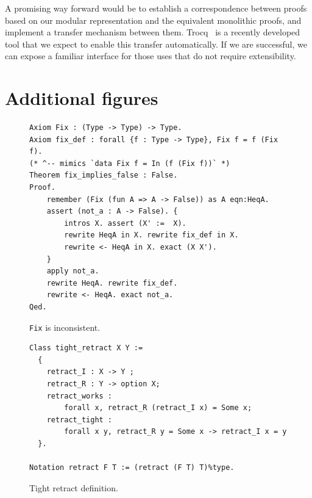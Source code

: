 \documentclass[sigplan,nonacm,review]{acmart}
\begin{document}
A promising way forward would be to establish a correspondence between proofs based on our modular representation and the equivalent monolithic proofs, and implement a transfer mechanism between them. Trocq~\cite{cohen2024trocq} is a recently developed tool that we expect to enable this transfer automatically. If we are successful, we can expose a familiar interface for those uses that do not require extensibility.





\appendix

\section{Additional figures}
\label{sec:additional-figures}

\begin{figure}[H]
\begin{lstlisting}[language=Coq]
Axiom Fix : (Type -> Type) -> Type.
Axiom fix_def : forall {f : Type -> Type}, Fix f = f (Fix f).
(* ^-- mimics `data Fix f = In (f (Fix f))` *)
Theorem fix_implies_false : False. 
Proof.
    remember (Fix (fun A => A -> False)) as A eqn:HeqA.
    assert (not_a : A -> False). { 
        intros X. assert (X' :=  X).
        rewrite HeqA in X. rewrite fix_def in X.
        rewrite <- HeqA in X. exact (X X').
    }
    apply not_a.
    rewrite HeqA. rewrite fix_def.
    rewrite <- HeqA. exact not_a.
Qed.
\end{lstlisting}
\caption{\texttt{Fix} is inconsistent.}
  \label{appendix:false_proof}
\end{figure}

\begin{figure}[H]
\begin{lstlisting}[language=Coq]
Class tight_retract X Y :=
  {
    retract_I : X -> Y ;
    retract_R : Y -> option X;
    retract_works : 
        forall x, retract_R (retract_I x) = Some x;
    retract_tight : 
        forall x y, retract_R y = Some x -> retract_I x = y
  }.

Notation retract F T := (retract (F T) T)%type.
\end{lstlisting}
\caption{Tight retract definition.}
  \label{appendix:tight_retract}
\end{figure}
\end{document}
